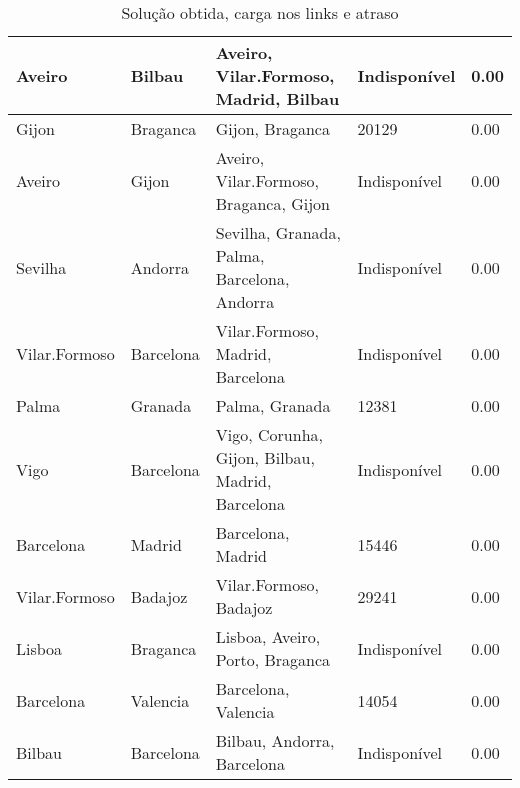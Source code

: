 \begin{table}[!htb]
{\begin{tabular}{|l|l|l|l|l|}
Aveiro & Bilbau & Aveiro, Vilar.Formoso, Madrid, Bilbau & Indisponível & 0.00 \\ \hline
Gijon & Braganca & Gijon, Braganca & 20129 & 0.00 \\ \hline
Aveiro & Gijon & Aveiro, Vilar.Formoso, Braganca, Gijon & Indisponível & 0.00 \\ \hline
Sevilha & Andorra & Sevilha, Granada, Palma, Barcelona, Andorra & Indisponível & 0.00 \\ \hline
Vilar.Formoso & Barcelona & Vilar.Formoso, Madrid, Barcelona & Indisponível & 0.00 \\ \hline
Palma & Granada & Palma, Granada & 12381 & 0.00 \\ \hline
Vigo & Barcelona & Vigo, Corunha, Gijon, Bilbau, Madrid, Barcelona & Indisponível & 0.00 \\ \hline
Barcelona & Madrid & Barcelona, Madrid & 15446 & 0.00 \\ \hline
Vilar.Formoso & Badajoz & Vilar.Formoso, Badajoz & 29241 & 0.00 \\ \hline
Lisboa & Braganca & Lisboa, Aveiro, Porto, Braganca & Indisponível & 0.00 \\ \hline
Barcelona & Valencia & Barcelona, Valencia & 14054 & 0.00 \\ \hline
Bilbau & Barcelona & Bilbau, Andorra, Barcelona & Indisponível & 0.00 \\ \hline
\end{tabular}}
\caption[]{Solução obtida, carga nos links e atraso}
\end{table}


